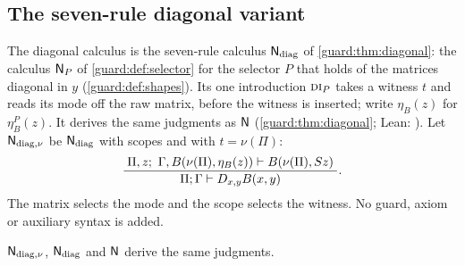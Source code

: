 \subsection{The seven-rule diagonal variant}
\label{wit:sec:diagonal}

The diagonal calculus is the seven-rule calculus $\mathsf{N}_{\mathrm{diag}}$ of
\cref{guard:thm:diagonal}: the calculus $\mathsf{N}_P$ of
\cref{guard:def:selector} for the selector $P$ that holds of the matrices
diagonal in $y$ (\cref{guard:def:shapes}).  Its one introduction
$\rulename{DI}_P$ takes a witness $t$ and reads its mode off the raw matrix,
before the witness is inserted; write $\eta_B(z)$ for $\eta^{P}_B(z)$.  It
derives the same judgments as $\mathsf{N}$ (\cref{guard:thm:diagonal}; Lean:
).  Let $\mathsf{N}_{\mathrm{diag},\nu}$ be
$\mathsf{N}_{\mathrm{diag}}$ with scopes and with $t=\nu(\Pi)$:
\[
 \infrule{\Pi,z;\ \Gamma,B(\nu(\Pi),\eta_B(z))\proves B(\nu(\Pi),\Suc z)}
         {\Pi;\Gamma\proves\D{x}{y}B(x,y)} .
\]
The matrix selects the mode and the scope selects the witness.  No guard,
axiom or auxiliary syntax is added.

\begin{theorem}
\label{wit:thm:diagonal}
$\mathsf{N}_{\mathrm{diag},\nu}$, $\mathsf{N}_{\mathrm{diag}}$ and $\mathsf{N}$ derive the
same judgments.
\end{theorem}

